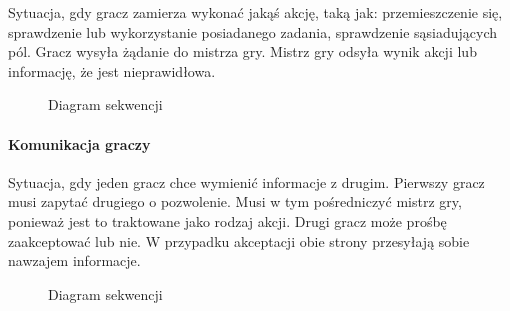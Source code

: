 \documentclass[11pt]{article}
\begin{document}
Sytuacja, gdy gracz zamierza wykonać jakąś akcję, taką jak: przemieszczenie się, sprawdzenie lub wykorzystanie posiadanego zadania, sprawdzenie sąsiadujących pól.
Gracz wysyła żądanie do mistrza gry. Mistrz gry odsyła wynik akcji lub informację, że jest nieprawidłowa.

\begin{figure}[!h]
	\centering
	\caption{Diagram sekwencji}
\end{figure}
\FloatBarrier

\paragraph{Komunikacja graczy}

Sytuacja, gdy jeden gracz chce wymienić informacje z drugim. Pierwszy gracz musi zapytać drugiego o pozwolenie. Musi w tym pośredniczyć mistrz gry, ponieważ jest to traktowane jako rodzaj akcji. Drugi gracz może prośbę zaakceptować lub nie. W przypadku akceptacji obie strony przesyłają sobie nawzajem informacje.

\begin{figure}[!h]
	\centering
	\caption{Diagram sekwencji}
\end{figure}
\FloatBarrier
\par
\end{document}
